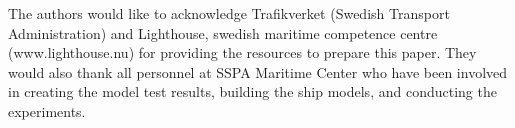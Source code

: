 \noindent The authors would like to acknowledge Trafikverket (Swedish Transport Administration) and Lighthouse, swedish maritime competence centre (www.lighthouse.nu) for providing the resources to prepare this paper. They would also thank all personnel at SSPA Maritime Center who have been involved in creating the model test results, building the ship models, and conducting the experiments.